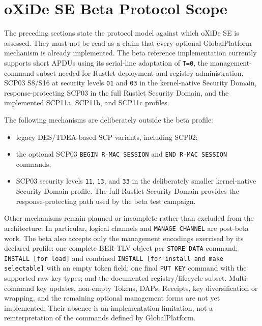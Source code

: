\section{oXiDe SE Beta Protocol Scope}
\label{sec:oxide-beta-protocol-scope}

The preceding sections state the protocol model against which oXiDe SE is
assessed. They must not be read as a claim that every optional GlobalPlatform
mechanism is already implemented. The beta reference implementation currently
supports short APDUs using its serial-line adaptation of \texttt{T=0}, the management-command subset
needed for Rustlet deployment and registry administration, SCP03 S8/S16 at
security levels \texttt{01} and \texttt{03} in the kernel-native Security
Domain, response-protecting SCP03 in the full Rustlet Security Domain, and the
implemented SCP11a, SCP11b, and SCP11c profiles.

The following mechanisms are deliberately outside the beta profile:
\begin{itemize}
\item legacy DES/TDEA-based SCP variants, including SCP02;
\item the optional SCP03 \texttt{BEGIN R-MAC SESSION} and
      \texttt{END R-MAC SESSION} commands;
\item SCP03 security levels \texttt{11}, \texttt{13}, and \texttt{33} in the
      deliberately smaller kernel-native Security Domain profile. The full
      Rustlet Security Domain provides the response-protecting path used by the
      beta test campaign.
\end{itemize}

Other mechanisms remain planned or incomplete rather than excluded from the
architecture. In particular, logical channels and \texttt{MANAGE CHANNEL} are
post-beta work. The beta also accepts only the management encodings exercised
by its declared profile: one complete BER-TLV object per \texttt{STORE DATA} command;
\texttt{INSTALL [for load]} and combined \texttt{INSTALL [for install and make
selectable]} with an empty token field; one final \texttt{PUT KEY} command with
the supported raw key types; and the documented registry/lifecycle subset.
Multi-command key updates, non-empty Tokens, DAPs, Receipts, key
diversification or wrapping, and the remaining optional management forms are
not yet implemented. Their absence is an implementation limitation, not a
reinterpretation of the commands defined by GlobalPlatform.

